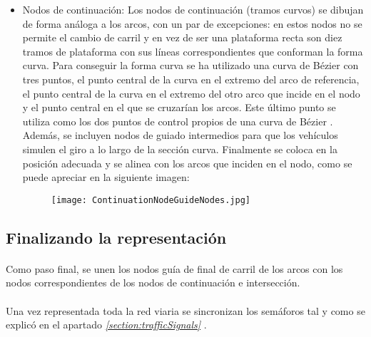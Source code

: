 \begin{itemize}
	\item Nodos de continuación:
	\newline
	\newline
	Los nodos de continuación (tramos curvos) se dibujan de forma análoga a los arcos, con un par de excepciones: en estos nodos no se permite el cambio de carril y en vez de ser una plataforma recta son diez tramos de plataforma con sus líneas correspondientes que conforman la forma curva.
	\newline
	\newline
	Para conseguir la forma curva se ha utilizado una curva de Bézier \cite{BezierCurves} con tres puntos, el punto central de la curva en el extremo del arco de referencia, el punto central de la curva en el extremo del otro arco que incide en el nodo y el punto central en el que se cruzarían los arcos. Este último punto se utiliza como los dos puntos de control propios de una curva de Bézier \cite{BezierCurves}.
	\newline
	\newline
	Además, se incluyen nodos de guiado intermedios para que los vehículos simulen el giro a lo largo de la sección curva. Finalmente se coloca en la posición adecuada y se alinea con los arcos que inciden en el nodo, como se puede apreciar en la siguiente imagen:
	
	\begin{figure}[H]
		\centering
			\texttt{[image: ContinuationNodeGuideNodes.jpg]}
	\end{figure}
	
	\end{itemize}
	
	\subsection{Finalizando la representación}
	\paragraph{}
	Como paso final, se unen los nodos guía de final de carril de los arcos con los nodos correspondientes de los nodos de continuación e intersección.
	
	\paragraph{}
	Una vez representada toda la red viaria se sincronizan los semáforos tal y como se explicó en el apartado \emph{\ref{section:trafficSignals} }.
	

